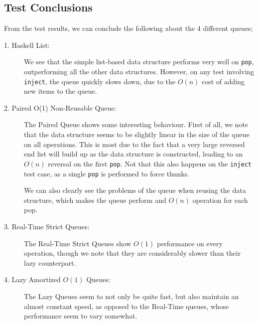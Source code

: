 \subsection{Test Conclusions}
 
From the test results, we can conclude the following about the 4 different queues;

\begin{description}
\item[1. Haskell List:]
We see that the simple list-based data structure performs very well on \texttt{pop}, outperforming all the other data structures.
However, on any test involving \texttt{inject}, the queue quickly slows down, due to the $O(n)$ cost of adding new items to the queue. 

\item[2. Paired O(1) Non-Reusable Queue:]
The Paired Queue shows some interesting behaviour.
First of all, we note that the data structure seems to be slightly linear in the size of the queue on all operations. This is most due to the fact that a very large reversed end list will build up as the data structure is constructed, leading to an $O(n)$ reversal on the first \texttt{pop}. Not that this also happens on the \texttt{inject} test case, as a single \texttt{pop} is performed to force thunks.

We can also clearly see the problems of the queue when reusing the data structure, which makes the queue perform and $O(n)$ operation for each pop.

\item[3. Real-Time Strict Queues:] 
The Real-Time Strict Queues show $O(1)$ performance on every operation, though we note that they are considerably slower than their lazy counterpart.

\item[4. Lazy Amortized $O(1)$ Queues:]
The Lazy Queues seem to not only be quite fast, but also maintain an almost constant speed, as opposed to the Real-Time queues, whose performance seem to vary somewhat.
\end{description}
